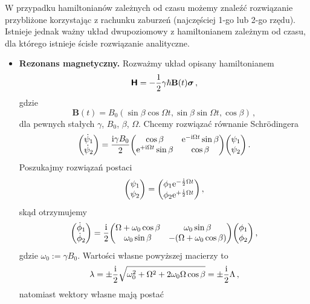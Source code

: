 \documentclass{myclass}
\begin{document}
W przypadku hamiltonianów zależnych od czasu możemy znaleźć rozwiązanie przybliżone korzystając z
rachunku zaburzeń (najczęściej 1-go lub 2-go rzędu). Istnieje jednak ważny układ dwupoziomowy z
hamiltonianem zależnym od czasu, dla którego istnieje ścisłe rozwiązanie analityczne.
\begin{itemize}
    \item \textbf{Rezonans magnetyczny.} Rozważmy układ opisany hamiltonianem
    \begin{equation*}
        \boldsymbol{\mathsf{H}} = -\frac{1}{2}\gamma\hbar\mathbf{B}(t)\boldsymbol{\sigma}\,,
    \end{equation*}    
    gdzie
    \begin{equation*}
        \mathbf{B}(t) = B_0(\sin\beta\cos\Omega t,\sin\beta\sin\Omega t, \cos\beta)\,,
    \end{equation*}
    dla pewnych stałych \(\gamma\), \(B_0\), \(\beta\), \(\Omega\). Chcemy rozwiązać równanie
    Schr\"{o}dingera
    \begin{equation*}
        \mqty(\dot{\psi}_1 \\ \dot{\psi}_2) = \frac{\im\gamma B_0}{2}\mqty(\cos\beta & \e^{-\im\Omega t}\sin\beta \\ \e^{+\im\Omega t}\sin\beta & \cos\beta) \mqty(\psi_1 \\ \psi_2)\,.
    \end{equation*}
    Poszukajmy rozwiązań postaci
    \begin{equation*}
        \mqty(\psi_1 \\ \psi_2) = \mqty(\phi_1\e^{-\frac{\im}{2}\Omega t} \\ \phi_2 \e^{+\frac{\im}{2}\Omega t})\,,
    \end{equation*}
    skąd otrzymujemy
    \begin{equation*}
        \mqty(\dot{\phi}_1 \\ \dot{\phi}_2) = \frac{\im}{2} \mqty(\Omega +\omega_0\cos\beta & \omega_0\sin\beta \\ \omega_0\sin\beta & -(\Omega +\omega_0\cos\beta)) \mqty(\phi_1 \\ \phi_2)\,,
    \end{equation*}
    gdzie \(\omega_0 := \gamma B_0\). Wartości własne powyższej macierzy to
    \begin{equation*}
        \lambda = \pm\frac{\mathrm{i}}{2}\sqrt{\omega_0^2 + \Omega^2 + 2\omega_0\Omega\cos\beta} = \pm\frac{\mathrm{i}}{2}\Lambda\,,
    \end{equation*}
    natomiast wektory własne mają postać
    \begin{equation*}

\end{equation*}
\end{itemize}
\end{document}

